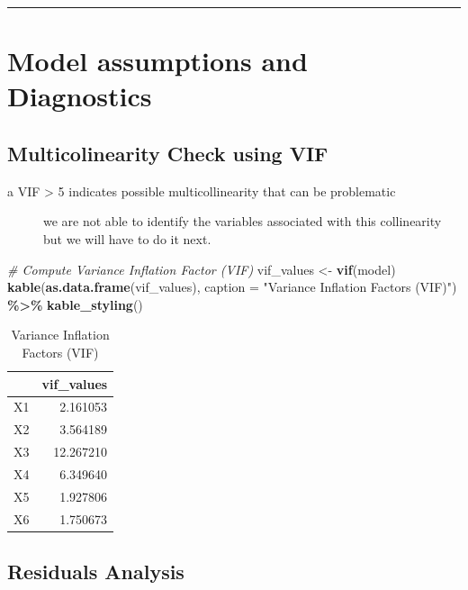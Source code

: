 \documentclass[
  12pt,
]{article}
\newenvironment{Shaded}{\begin{snugshade}}{\end{snugshade}}
\newcommand{\AttributeTok}[1]{\textcolor[rgb]{0.13,0.29,0.53}{#1}}
\newcommand{\CommentTok}[1]{\textcolor[rgb]{0.56,0.35,0.01}{\textit{#1}}}
\newcommand{\FunctionTok}[1]{\textcolor[rgb]{0.13,0.29,0.53}{\textbf{#1}}}
\newcommand{\NormalTok}[1]{#1}
\newcommand{\OtherTok}[1]{\textcolor[rgb]{0.56,0.35,0.01}{#1}}
\newcommand{\SpecialCharTok}[1]{\textcolor[rgb]{0.81,0.36,0.00}{\textbf{#1}}}
\newcommand{\StringTok}[1]{\textcolor[rgb]{0.31,0.60,0.02}{#1}}
\begin{document}
\begin{center}\rule{0.5\linewidth}{0.5pt}\end{center}

\section{Model assumptions and
Diagnostics}\label{model-assumptions-and-diagnostics}

\subsection{Multicolinearity Check using
VIF}\label{multicolinearity-check-using-vif}

\begin{description}
\item[a VIF \textgreater{} 5 indicates possible multicollinearity that
can be problematic]
we are not able to identify the variables associated with this
collinearity but we will have to do it next.
\end{description}

\begin{Shaded}
\begin{Highlighting}[]
\CommentTok{\# Compute Variance Inflation Factor (VIF)}
\NormalTok{vif\_values }\OtherTok{\textless{}{-}} \FunctionTok{vif}\NormalTok{(model)}
\FunctionTok{kable}\NormalTok{(}\FunctionTok{as.data.frame}\NormalTok{(vif\_values), }\AttributeTok{caption =} \StringTok{"Variance Inflation Factors (VIF)"}\NormalTok{) }\SpecialCharTok{\%\textgreater{}\%} \FunctionTok{kable\_styling}\NormalTok{()}
\end{Highlighting}
\end{Shaded}

\begin{longtable}[t]{lr}
\caption{\label{tab:unnamed-chunk-17}Variance Inflation Factors (VIF)}\\
\toprule
 & vif\_values\\
\midrule
X1 & 2.161053\\
X2 & 3.564189\\
X3 & 12.267210\\
X4 & 6.349640\\
X5 & 1.927806\\
\addlinespace
X6 & 1.750673\\
\bottomrule
\end{longtable}

\subsection{Residuals Analysis}\label{residuals-analysis}
\end{document}
